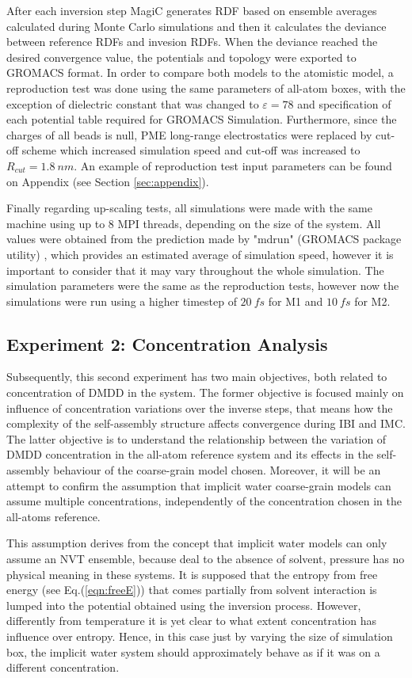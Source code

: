 \documentclass[10pt,a4paper,twoside]{article}
\begin{document}
 After each inversion step MagiC generates RDF based on ensemble averages calculated during Monte Carlo simulations and then it calculates the deviance between reference RDFs and invesion RDFs. When the deviance reached the desired convergence value, the potentials and topology were exported to GROMACS format. In order to compare both models to the atomistic model, a reproduction test was done using the same parameters of all-atom boxes, with the exception of dielectric constant that was changed to $\varepsilon = 78$ and specification of each potential table required for GROMACS Simulation. Furthermore, since the charges of all beads is null, PME long-range electrostatics were replaced by cut-off scheme which increased simulation speed and cut-off was increased to $R_{cut} = 1.8 \ nm$. An example of reproduction test input parameters can be found on Appendix (see Section \ref{sec:appendix}).
 
 Finally regarding up-scaling tests, all simulations were made with the same machine using up to 8 MPI threads, depending on the size of the system. All values were obtained from the prediction made by "mdrun" (GROMACS package utility) \cite{gromanual}, which provides an estimated average of simulation speed, however it is important to consider that it may vary throughout the whole simulation. The simulation parameters were the same as the reproduction tests, however now the simulations were run using a higher timestep of $20\ fs$ for M1 and $10\ fs$ for M2. 

\subsection{Experiment 2: Concentration Analysis}
 Subsequently, this second experiment has two main objectives, both related to concentration of DMDD in the system. The former objective is focused mainly on influence of concentration variations over the inverse steps, that means how the complexity of the self-assembly 
 structure affects convergence during IBI and IMC. The latter objective is to understand the relationship between the variation of DMDD concentration in the all-atom reference system and its effects in the self-assembly behaviour of the coarse-grain model chosen. Moreover, it will be an attempt to confirm the assumption that implicit water coarse-grain models can assume multiple concentrations, independently of the concentration chosen in the all-atoms reference.
 
 This assumption derives from the concept that implicit water models can only assume an NVT ensemble, because deal to the absence of solvent, pressure has no physical meaning in these systems. It is supposed that the entropy from free energy (see Eq.(\ref{eqn:freeE})) that comes partially from solvent interaction is lumped into the potential obtained using the inversion process. However,   differently from temperature it is yet clear to what extent concentration has influence over entropy. Hence, in this case just by varying the size of simulation box, the implicit water system should approximately behave as if it was on a different concentration.
  
\end{document}
